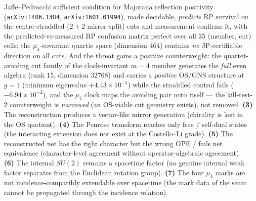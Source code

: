 Jaffe--Pedrocchi sufficient condition for Majorana reflection positivity
(\texttt{arXiv:1406.1384}, \texttt{arXiv:1601.01994}), made decidable, \emph{predicts} RP
survival on the centre-straddled ($2{+}2$ mirror-split) cuts and measurement confirms it,
with the predicted-vs-measured RP confusion matrix perfect over all $35$ (member, cut)
cells; the $\mu_4$-covariant quartic space (dimension $464$) contains \emph{no}
JP-certifiable direction on all cuts. And the threat gains a positive counterweight: the
quartet-avoiding cut family of the clock-invariant $m{=}4$ member generates the \emph{full}
even algebra (rank $15$, dimension $32768$) and carries a \emph{positive} OS/GNS structure
at $g{=}1$ (minimum eigenvalue $+4.43\times10^{-5}$) while the straddled control fails
($-6.94\times10^{-2}$), and the $\mu_4$ clock maps the avoiding pair onto itself --- the
kill-test-2 counterweight is \emph{narrowed} (an OS-viable cut geometry exists), not
removed.
\textbf{(3)} The reconstruction produces a vector-like mirror generation (chirality is lost in the
OS quotient).
\textbf{(4)} The Penrose transform reaches only free / self-dual states (the interacting extension
does not exist at the Costello--Li grade).
\textbf{(5)} The reconstructed net has the right character but the wrong OPE / fails net equivalence
(character-level agreement without operator-algebraic agreement).
\textbf{(6)} The internal $SU(2)$ remains a spacetime factor (no genuine internal weak factor
separates from the Euclidean rotation group).
\textbf{(7)} The four $\mu_4$ marks are not incidence-compatibly extendable over spacetime (the
mark data of the seam cannot be propagated through the incidence relation).

